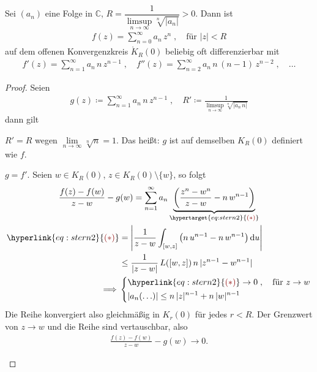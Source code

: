 \begin{theorem}[Satz] \label{thm:1.35}
  Sei $(a_n)$ eine Folge in $\mathbb{C}$, $R = \dfrac{1}{\limsup\limits_{n \to \infty} \sqrt[n]{|a_n|}} > 0$.
  Dann ist
  \begin{align*}
    f(z) = \sum\limits_{n=0}^{\infty} a_n \, z^n \; , \quad \text{für } |z| < R
  \end{align*}
  auf dem offenen Konvergenzkreis $\mathring{K}_R(0)$ beliebig oft differenzierbar mit
  \begin{align*}
    f'(z) = \sum\limits_{n=1}^{\infty} a_n \, n \, z^{n-1} \; , \quad
    f''(z) = \sum\limits_{n=2}^{\infty} a_n \, n \, (n-1) \, z^{n-2} \; , \quad \ldots
  \end{align*}
  
  \begin{proof} Seien
    \begin{align*}
      g(z) \coloneq \sum\limits_{n=1}^{\infty} a_n \, n \, z^{n-1} \; , \quad R' \coloneq \frac{1}{\limsup\limits_{n \to \infty} \sqrt[n]{|a_n \, n|}}
    \end{align*}
    dann gilt
    \begin{enum-arab}
      \item $R' = R$ wegen $\lim\limits_{n \to \infty} \sqrt[n]{n} = 1$. Das heißt: $g$ ist auf demselben $K_R(0)$ definiert wie $f$.
      
      \item $g = f'$. Seien $w \in K_R(0)$, $z \in K_R(0) \setminus \{w\}$, so folgt
      \begin{gather*}
        \frac{f(z) - f(w)}{z - w} - g(w) = \sum\limits_{n = 1}^{\infty} a_n \underbrace{\left( \frac{z^n - w^n}{z - w} - n \, w^{n-1} \right)}_{{\hypertarget{eq:stern2}{{\color{DarkRed} (\ast)}}}} \\
        \begin{aligned}
          {\hyperlink{eq:stern2}{{\color{DarkRed} (\ast)}}} &= \left| \frac{1}{z - w} \int_{[w,z]} \left( n \, u^{n-1} - n \, w^{n-1} \right) \mathrm{d}u \right| \\
          &\leq \frac{1}{|z-w|} \, L([w,z]) \, n \, |z^{n-1} - w^{n-1}| \\
          \implies &
          \begin{dcases}
            {\hyperlink{eq:stern2}{{\color{DarkRed} (\ast)}}} \to 0 \; , \quad \text{für } z \to w \\
            |a_n(\ldots)| \leq n \, |z|^{n-1} + n \, |w|^{n-1}
          \end{dcases}
        \end{aligned}
      \end{gather*}
      Die Reihe konvergiert also gleichmäßig in $K_r(0)$ für jedes $r < R$. Der Grenzwert von $z \to w$ und die Reihe sind vertauschbar, also
      \begin{align*}
        \frac{f(z) - f(w)}{z - w} - g(w) \to 0.
      \end{align*}
    \end{enum-arab}
  \end{proof}
\end{theorem}

